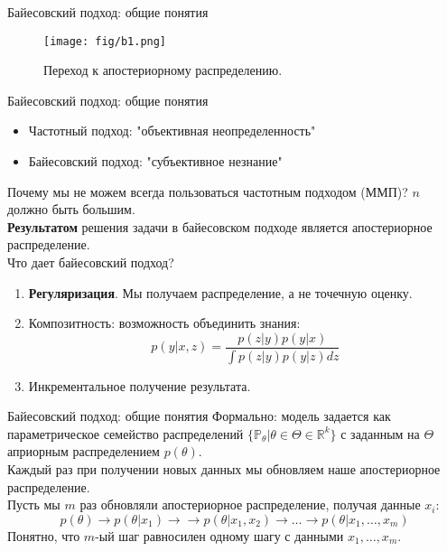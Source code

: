 \documentclass[handout]{beamer}
\begin{document}
\begin{frame}{Байесовский подход: общие понятия}
	\begin{figure}
	    \texttt{[image: fig/b1.png]}
	    \caption{\small Переход к апостериорному распределению.
	    } 
	    \label{fig:w_series}
	\end{figure}
\end{frame}

\begin{frame}{Байесовский подход: общие понятия}
	\begin{itemize}
		\item Частотный подход: "объективная неопределенность"
		\item Байесовский подход: "субъективное незнание"
	\end{itemize}
	Почему мы не можем всегда пользоваться частотным подходом (ММП)? $n$ должно быть большим.\\
	\textbf{Результатом} решения задачи в байесовском подходе является апостериорное распределение.\\
	Что дает байесовский подход?
	\begin{enumerate}
		\item \textbf{Регуляризация}. Мы получаем распределение, а не точечную оценку.
		\item Композитность: возможность объединить знания:
		\begin{equation*}
			p(y|x, z)=\frac{p(z|y)p(y|x)}{\int p(z|y)p(y|z)dz}
		\end{equation*}
		\item Инкрементальное получение результата.
	\end{enumerate}
\end{frame}

\begin{frame}{Байесовский подход: общие понятия}
	Формально: модель задается как параметрическое семейство распределений $\{\mathbb{P}_{\theta}|\theta\in\Theta\in\mathbb{R}^k\}$ с заданным на $\Theta$ априорным распределением $p(\theta)$.\\
	Каждый раз при получении новых данных мы обновляем наше апостериорное распределение.\\
	Пусть мы $m$ раз обновляли апостериорное распределение, получая данные $x_i$:
	\begin{equation*}
		p(\theta)\rightarrow p(\theta | x_1) \rightarrow \rightarrow p(\theta | x_1, x_2) \rightarrow \dots \rightarrow p(\theta | x_1, \dots, x_m)
	\end{equation*}
	Понятно, что $m$-ый шаг равносилен одному шагу с данными $x_1,\dots,x_m$.
\end{frame}
\end{document}
